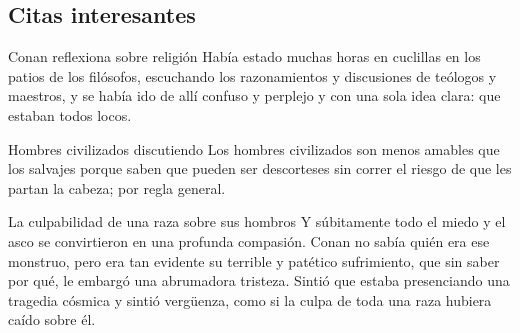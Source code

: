 \subsection{Citas interesantes}

\begin{frame}{}
\begin{exampleblock}{Conan reflexiona sobre religión}
Había estado muchas horas en cuclillas en los patios de los filósofos, escuchando los razonamientos y discusiones de teólogos y maestros, y se había ido de allí confuso y perplejo y con una sola idea clara: que estaban todos locos.
\end{exampleblock}
\end{frame}

\begin{frame}{}
\begin{exampleblock}{Hombres civilizados discutiendo}
Los hombres civilizados son menos amables que los salvajes porque saben que pueden ser descorteses sin correr el riesgo de que les partan la cabeza; por regla general.
\end{exampleblock}
\end{frame}

\begin{frame}{}
\begin{exampleblock}{La culpabilidad de una raza sobre sus hombros}
Y súbitamente todo el miedo y el asco se convirtieron en una profunda compasión. Conan no sabía quién era ese monstruo, pero era tan evidente su terrible y patético sufrimiento, que sin saber por qué, le embargó una abrumadora tristeza. Sintió que estaba presenciando una tragedia cósmica y sintió vergüenza, como si la culpa de toda una raza hubiera caído sobre él.
\end{exampleblock}
\end{frame}

